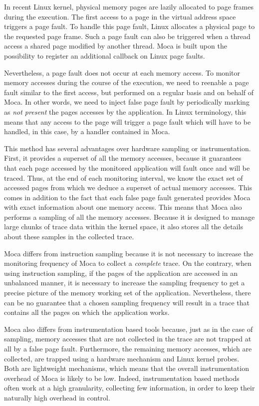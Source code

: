 In recent Linux kernel, physical memory pages are lazily allocated to page frames during
the execution. The first access to a page in the virtual address space triggers a page fault.
To handle this page fault, Linux allocates a physical page to the requested page frame.
Such a page fault can also be triggered when a thread access a shared page modified by
another thread. \gls{Moca} is built upon the possibility to register an additional callback on Linux page faults.

Nevertheless, a page fault does not occur at each memory access. To monitor memory accesses during
the course of the execution, we need to reenable a page fault similar to the first access, but
performed on a regular basis and on behalf of \gls{Moca}.
In other words, we need to inject false page fault by periodically marking as \emph{not present}
the pages accesses by the application.
In Linux terminology, this means that any access to the page will trigger a page fault which
will have to be handled, in this case, by a handler contained in \gls{Moca}.

This method has several advantages over hardware sampling or
instrumentation. First, it provides a superset of all the memory accesses, because it
guarantees that each page accessed by the monitored application will fault once
and will be traced. Thus, at the end of each monitoring interval, we know the exact set
of accessed pages from which we deduce a superset of actual memory accesses.
This comes in addition to the fact that each false page fault generated provides \gls{Moca} with
exact information about one memory access. This means that \gls{Moca} also performs a sampling
of all the memory accesses. Because it is designed to manage large chunks of trace data
within the kernel space, it also stores all the details about these samples in the collected trace.

\gls{Moca} differs from instruction sampling because it is not necessary to increase the monitoring
frequency of \gls{Moca} to collect a \emph{complete} trace. On the contrary, when using instruction sampling,
if the pages of the application are accessed in an unbalanced manner, it is necessary to increase
the sampling frequency to get a precise picture of the memory working set of the application.
Nevertheless, there can be no guarantee that a chosen sampling frequency will result in a trace
that contains all the pages on which the application works.

\gls{Moca} also differs from instrumentation based tools because, just as in the case of sampling,
memory accesses that are not collected in the trace are not trapped at all by a false page fault. Furthermore, the
remaining memory accesses, which are collected, are trapped using a hardware mechanism and
Linux kernel probes. Both are lightweight mechanisms, which means that
the overall instrumentation overhead of \gls{Moca} is likely to be low.
Indeed, instrumentation based methods often work at a high granularity, collecting few information,
in order to keep their naturally high overhead in control.


